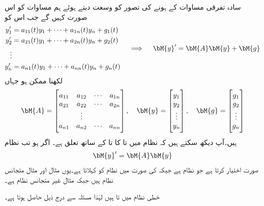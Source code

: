 سادہ تفرقی مساوات کے  ہونے کی تصور کو وسعت دیتے ہوئے ہم مساوات  کو اس صورت  کہیں گے جب اس کو
\begin{gather}
\begin{aligned}\label{مساوات_خطی_نظام_الف}
y_1'&=a_{11}(t)y_1+\cdots+a_{1n}(t)y_n+g_1(t)\\
y_2'&=a_{21}(t)y_1+\cdots+a_{2n}(t)y_n+g_2(t)\\
\vdots\\
y_n'&=a_{n1}(t)y_1+\cdots+a_{nn}(t)y_n+g_n(t)
\end{aligned}\quad \implies \quad
\bM{y}'=\bM{A}\bM{y}+\bM{g}
\end{gather}
لکھنا ممکن ہو جہاں
\begin{align*}
\bM{A}=
\begin{bmatrix}
a_{11} & a_{12}&\cdots & a_{1n}\\
a_{21} & a_{22}&\cdots & a_{2n}\\
&\vdots & &\\
a_{n1} & a_{n2}&\cdots & a_{nn}
\end{bmatrix}, \quad 
\bM{y}=
\begin{bmatrix}
y_1\\
y_2\\
\vdots\\
y_n
\end{bmatrix}, \quad 
\bM{g}=
\begin{bmatrix}
g_1\\
g_2\\
\vdots\\
g_n
\end{bmatrix}
\end{align*}
ہیں۔آپ دیکھ سکتے ہیں کہ نظام  میں  تا  کا  تا  کے ساتھ  تعلق ہے۔ اگر  ہو تب نظام 
\begin{align}\label{مساوات_خطی_نظام_ب}
\bM{y}'=\bM{A}\bM{y}
\end{align}
صورت اختیار کرتا ہے جو   نظام ہے جبکہ  کی صورت میں نظام  کو  کہلاتا ہے۔یوں مثال  اور مثال  متجانس نظام ہیں جبکہ مثال  غیر متجانس نظام ہے۔

خطی نظام میں  تا   ہیں لہٰذا مسئلہ  سے درج ذیل حاصل ہوتا ہے۔

